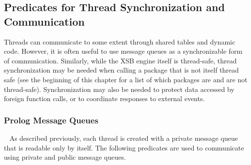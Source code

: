 \subsection{Predicates for Thread Synchronization and Communication} 
\label{sec:synchronization}
%
Threads can communicate to some extent through shared tables and
dynamic code.  However, it is often useful to use message queues as a
synchronizable form of communication.  Similarly, while the XSB engine
itself is thread-safe, thread synchronization may be needed when
calling a package that is not itself thread safe (see the beginning of
this chapter for a list of which packages are and are not
thread-safe).  Synchronization may also be needed to protect data
accessed by foreign function calls, or to coordinate responses to
external events.

\subsubsection{Prolog Message Queues}~\label{sec:message-queues}
%
As described previously, each thread is created with a private message
queue that is readable only by itself.  The following predicates are
used to communicate using private and public message queues.
%
